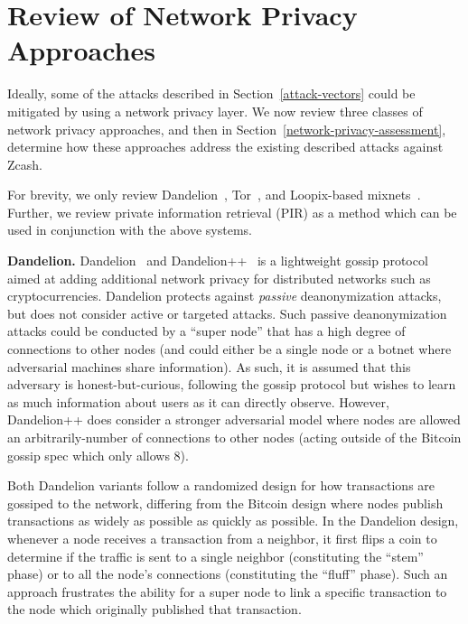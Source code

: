 \documentclass{article}
\begin{document}
\section{Review of Network Privacy Approaches}
\label{network-privacy-review}

Ideally, some of the attacks described in Section~\ref{attack-vectors} could be
mitigated by using a network privacy layer. We now review three
classes of network privacy approaches, and then in
Section~\ref{network-privacy-assessment}, determine how these approaches
address the existing described attacks against Zcash.

For brevity, we only review
Dandelion~\cite{Fanti:2018:DLC,BojjaVenkatakrishnan:2017:DRB},
Tor~\cite{tor-specification}, and
Loopix-based mixnets~\cite{Piotrowska:2017:LAS}.
Further, we review private information retrieval (PIR) as a method which can be
used in conjunction with the above systems.

\textbf{Dandelion.}
Dandelion~\cite{BojjaVenkatakrishnan:2017:DRB} and
Dandelion++~\cite{Fanti:2018:DLC} is a lightweight gossip protocol aimed at
adding additional network privacy for
distributed networks such as cryptocurrencies. Dandelion protects against
\emph{passive}
deanonymization attacks, but does not consider active or targeted attacks. Such
passive deanonymization attacks could be conducted by a ``super node'' that has
a high degree of connections to other nodes (and could either be a single node
or a botnet where adversarial machines share information). As such, it is
assumed that this adversary is honest-but-curious, following the gossip protocol
but wishes to learn as much information about users as it can directly observe.
However, Dandelion++ does consider a stronger adversarial model where nodes are
allowed an arbitrarily-number of connections to other nodes (acting outside of the
Bitcoin gossip spec which only allows 8).

Both Dandelion variants follow a randomized design for how transactions are
gossiped to the network, differing from the Bitcoin design where nodes publish
transactions as widely as possible as quickly as possible. In the Dandelion
design, whenever a node receives a transaction from a neighbor, it
first flips a coin to determine if the traffic is sent to a single
neighbor (constituting the ``stem'' phase) or to all the node's connections
(constituting the ``fluff'' phase). Such an approach frustrates the ability for
a super node to link a specific transaction to the node which originally
published that transaction.
\end{document}
